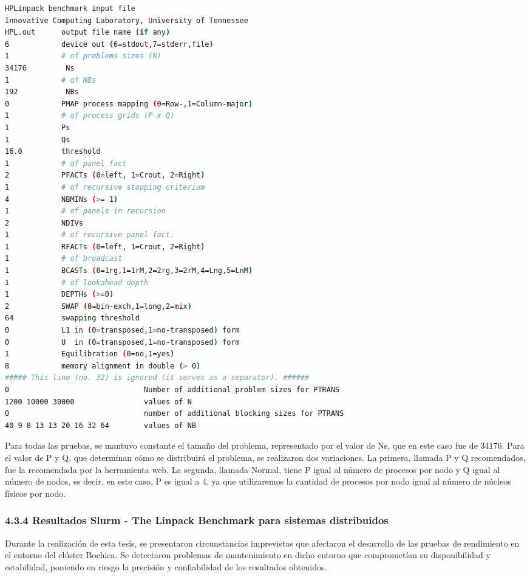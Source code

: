 \begin{spacing}{1.5}
\begin{lstlisting}[language=bash]
      HPLinpack benchmark input file
Innovative Computing Laboratory, University of Tennessee
HPL.out      output file name (if any)
6            device out (6=stdout,7=stderr,file)
1            # of problems sizes (N)
34176         Ns
1            # of NBs
192           NBs
0            PMAP process mapping (0=Row-,1=Column-major)
1            # of process grids (P x Q)
1            Ps
1            Qs
16.0         threshold
1            # of panel fact
2            PFACTs (0=left, 1=Crout, 2=Right)
1            # of recursive stopping criterium
4            NBMINs (>= 1)
1            # of panels in recursion
2            NDIVs
1            # of recursive panel fact.
1            RFACTs (0=left, 1=Crout, 2=Right)
1            # of broadcast
1            BCASTs (0=1rg,1=1rM,2=2rg,3=2rM,4=Lng,5=LnM)
1            # of lookahead depth
1            DEPTHs (>=0)
2            SWAP (0=bin-exch,1=long,2=mix)
64           swapping threshold
0            L1 in (0=transposed,1=no-transposed) form
0            U  in (0=transposed,1=no-transposed) form
1            Equilibration (0=no,1=yes)
8            memory alignment in double (> 0)
##### This line (no. 32) is ignored (it serves as a separator). ######
0                               Number of additional problem sizes for PTRANS
1200 10000 30000                values of N
0                               number of additional blocking sizes for PTRANS
40 9 8 13 13 20 16 32 64        values of NB

\end{lstlisting}

Para todas las pruebas, se mantuvo constante el tamaño del problema, representado por el valor de Ns, que en este caso fue de 34176. Para el valor de P y Q, que determinan cómo se distribuirá el problema, se realizaron dos variaciones. La primera, llamada P y Q recomendados, fue la recomendada por la herramienta web. La segunda, llamada Normal, tiene P igual al número de procesos por nodo y Q igual al número de nodos, es decir, en este caso, P es igual a 4, ya que utilizaremos la cantidad de procesos por nodo igual al número de núcleos físicos por nodo.

\subsubsection{4.3.4 Resultados Slurm - The Linpack Benchmark para sistemas distribuidos}

Durante la realización de esta tesis, se presentaron circunstancias imprevistas que afectaron el desarrollo de las pruebas de rendimiento en el entorno del clúster Bochica. Se detectaron problemas de mantenimiento en dicho entorno que comprometían su disponibilidad y estabilidad, poniendo en riesgo la precisión y confiabilidad de los resultados obtenidos.


\end{spacing}
